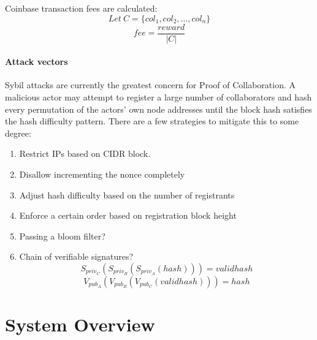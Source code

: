 \documentclass[10pt,twocolumn]{article}
\begin{document}
Coinbase transaction fees are calculated:
\[Let\ {C} = \{col_1,col_2,\dots,col_n\}\]
\[{fee}=\frac{reward}{|C|}\]

\paragraph{Attack vectors}
Sybil attacks are currently the greatest concern for Proof of Collaboration.  A malicious actor may attempt to register a large number of collaborators and hash every permutation of the actors' own node addresses until the block hash satisfies the hash difficulty pattern.  There are a few strategies to mitigate this to some degree:
\begin{enumerate}[noitemsep]
\item Restrict IPs based on CIDR block.
\item Disallow incrementing the nonce completely
\item Adjust hash difficulty based on the number of registrants
\item Enforce a certain order based on registration block height
\item Passing a bloom filter?
\item Chain of verifiable signatures?
\[S_{priv_C}(S_{priv_B}(S_{priv_A}(hash))) = {validhash}\]
\[V_{pub_A}(V_{pub_B}(V_{pub_C}(validhash))) = {hash}\]
\end{enumerate}


\section{System Overview}
\end{document}
